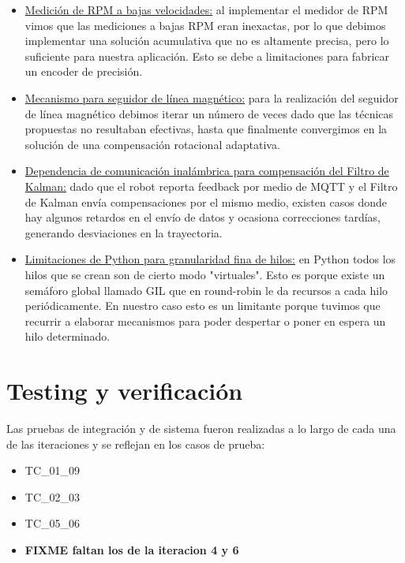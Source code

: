 \begin{itemize}
    \item \underline{Medición de RPM a bajas velocidades:} al implementar el medidor de RPM vimos que las mediciones a bajas RPM eran inexactas, por lo que debimos implementar una solución acumulativa que no es altamente precisa, pero lo suficiente para nuestra aplicación. Esto se debe a limitaciones para fabricar un encoder de precisión.

    \item \underline{Mecanismo para seguidor de línea magnético:} para la realización del seguidor de línea magnético debimos iterar un número de veces dado que las técnicas propuestas no resultaban efectivas, hasta que finalmente convergimos en la solución de una compensación rotacional adaptativa.

    \item \underline{Dependencia de comunicación inalámbrica para compensación del Filtro de Kalman:} dado que el robot reporta feedback por medio de MQTT y el Filtro de Kalman envía compensaciones por el mismo medio, existen casos donde hay algunos retardos en el envío de datos y ocasiona correcciones tardías, generando desviaciones en la trayectoria.

    \item \underline{Limitaciones de Python para granularidad fina de hilos:} en Python todos los hilos que se crean son de cierto modo "virtuales". Esto es porque existe un semáforo global llamado GIL que en round-robin le da recursos a cada hilo periódicamente. En nuestro caso esto es un limitante porque tuvimos que recurrir a elaborar mecanismos para poder despertar o poner en espera un hilo determinado.    
\end{itemize}


\section{Testing y verificación}

Las pruebas de integración y de sistema fueron realizadas a lo largo de cada una de las iteraciones y se reflejan en los casos de prueba:

\begin{itemize}
    \item TC\_01\_09
    \item TC\_02\_03
    \item TC\_05\_06
    \item \textbf{FIXME faltan los de la iteracion 4 y 6}
\end{itemize}


